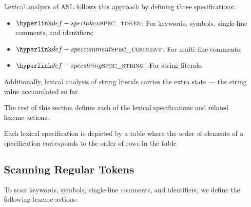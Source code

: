 Lexical analysis of ASL follows this approach by defining three specifications:
\begin{itemize}
  \item $\spectoken$: For keywords, symbols, single-line comments, and identifiers;
  \item $\speccomment$: For multi-line comments;
  \item $\specstring$: For string literals.
\end{itemize}

Additionally, lexical analysis of string literals carries the extra state ---
the string value accumulated so far.

The rest of this section defines each of the lexical specifications and related lexeme actions.

Each lexical specification is depicted by a table where the order of elements
of a specification corresponds to the order of rows in the table.

\subsection{Scanning Regular Tokens}
To scan keywords, symbols, single-line comments, and identifiers,
we define the following lexeme actions:

